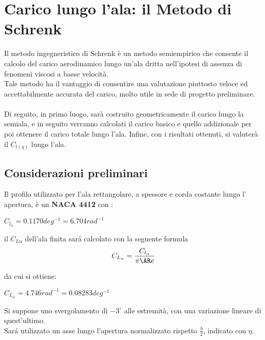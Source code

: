 \chapter{Carico lungo l'ala: il Metodo di Schrenk}

Il metodo ingegneristico di Schrenk è un metodo semiempirico che consente il calcolo del carico aerodinamico lungo un'ala dritta nell’ipotesi di assenza di fenomeni viscosi a basse velocità.\\
Tale metodo ha il vantaggio di consentire una valutazione piuttosto veloce ed accettabilmente accurata del carico, molto utile in sede di progetto preliminare.\\
\\
Di seguito, in primo luogo, sarà costruito geometricamente il carico lungo la semiala, e in seguito verranno calcolati il carico basico e quello addizionale per poi ottenere il carico totale lungo l’ala. Infine, con i risultati ottenuti, si valuterà il $C_{l(y)}$ lungo l’ala.

\section{Considerazioni preliminari}

Il profilo utilizzato per l’ala rettangolare, a spessore  e corda costante lungo l’ apertura, è un {\bfseries NACA 4412} \cite{prof:jane} con :

\begin {center}
$C_{l_{\alpha}}=0.1170 deg^{-1}=6.704 rad^{-1}$
\end{center}

il $C_{L{\alpha}}$ dell'ala finita sará calcolato con la seguente formula \\

\begin{equation}
\label{eqn:gt}
C_{L_{\alpha}}=\frac {C_{l_{\alpha}}}{{\pi}{\AR}e}
\end{equation}


da cui si ottiene:\\ 

\begin {center}
$C_{L_{\alpha}}=4.746 rad^{-1}=0.08283 deg^{-1}$
\end{center}


Si suppone uno svergolamento di $-3^\circ $ alle estremità, con una variazione lineare di quest'ultimo.\\
Sará utilizzato un asse lungo l'apertura normalizzato rispetto $\frac{b}{2}$, indicato con $\eta$.\\


